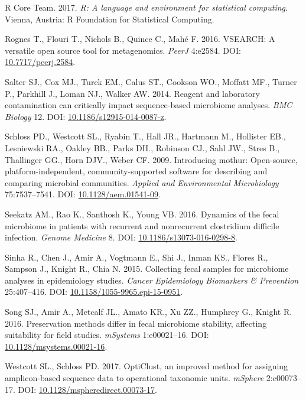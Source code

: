 \documentclass[12pt,]{article}
\begin{document}
\hypertarget{ref-r_citation_2017}{}
R Core Team. 2017. \emph{R: A language and environment for statistical
computing}. Vienna, Austria: R Foundation for Statistical Computing.

\hypertarget{ref-vsearch_Rognes_2016}{}
Rognes T., Flouri T., Nichols B., Quince C., Mahé F. 2016. VSEARCH: A
versatile open source tool for metagenomics. \emph{PeerJ} 4:e2584. DOI:
\href{https://doi.org/10.7717/peerj.2584}{10.7717/peerj.2584}.

\hypertarget{ref-contamination_Salter2014}{}
Salter SJ., Cox MJ., Turek EM., Calus ST., Cookson WO., Moffatt MF.,
Turner P., Parkhill J., Loman NJ., Walker AW. 2014. Reagent and
laboratory contamination can critically impact sequence-based microbiome
analyses. \emph{BMC Biology} 12. DOI:
\href{https://doi.org/10.1186/s12915-014-0087-z}{10.1186/s12915-014-0087-z}.

\hypertarget{ref-mothur_schloss_2009}{}
Schloss PD., Westcott SL., Ryabin T., Hall JR., Hartmann M., Hollister
EB., Lesniewski RA., Oakley BB., Parks DH., Robinson CJ., Sahl JW.,
Stres B., Thallinger GG., Horn DJV., Weber CF. 2009. Introducing mothur:
Open-source, platform-independent, community-supported software for
describing and comparing microbial communities. \emph{Applied and
Environmental Microbiology} 75:7537--7541. DOI:
\href{https://doi.org/10.1128/aem.01541-09}{10.1128/aem.01541-09}.

\hypertarget{ref-erin_seekatz_2016}{}
Seekatz AM., Rao K., Santhosh K., Young VB. 2016. Dynamics of the fecal
microbiome in patients with recurrent and nonrecurrent clostridium
difficile infection. \emph{Genome Medicine} 8. DOI:
\href{https://doi.org/10.1186/s13073-016-0298-8}{10.1186/s13073-016-0298-8}.

\hypertarget{ref-preservation_Sinha_2015}{}
Sinha R., Chen J., Amir A., Vogtmann E., Shi J., Inman KS., Flores R.,
Sampson J., Knight R., Chia N. 2015. Collecting fecal samples for
microbiome analyses in epidemiology studies. \emph{Cancer Epidemiology
Biomarkers \& Prevention} 25:407--416. DOI:
\href{https://doi.org/10.1158/1055-9965.epi-15-0951}{10.1158/1055-9965.epi-15-0951}.

\hypertarget{ref-preservation_Song_2016}{}
Song SJ., Amir A., Metcalf JL., Amato KR., Xu ZZ., Humphrey G., Knight
R. 2016. Preservation methods differ in fecal microbiome stability,
affecting suitability for field studies. \emph{mSystems} 1:e00021--16.
DOI:
\href{https://doi.org/10.1128/msystems.00021-16}{10.1128/msystems.00021-16}.

\hypertarget{ref-opticlust_Westcott_2017}{}
Westcott SL., Schloss PD. 2017. OptiClust, an improved method for
assigning amplicon-based sequence data to operational taxonomic units.
\emph{mSphere} 2:e00073--17. DOI:
\href{https://doi.org/10.1128/mspheredirect.00073-17}{10.1128/mspheredirect.00073-17}.
\end{document}
